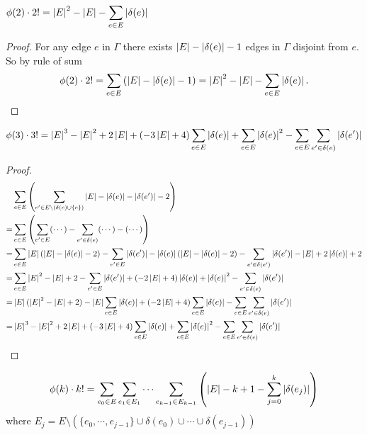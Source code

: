 \begin{lem}
\(\displaystyle \phi(2)\cdot 2! = \left|E\right|^2 - \left|E\right| - \sum_{e \in E} \left|\delta(e)\right|\)
\end{lem}
\begin{proof}
    For any edge \(e\) in \(\Gamma\) there exists \(\left|E\right| - \left|\delta(e)\right| - 1\)
    edges in \(\Gamma\) disjoint from \(e\).
    So by rule of sum
    \[
    \phi(2)\cdot 2! = \sum_{e \in E} \left(\left|E\right| - \left|\delta(e)\right| - 1\right) = \left|E\right|^2 - \left|E\right| - \sum_{e \in E} \left|\delta(e)\right|.
    \]
\end{proof}

\begin{lem}
    \[
\phi(3)\cdot 3! = \left|E\right|^3 - \left|E\right|^2 + 2\left|E\right| + (-3\left|E\right| + 4)\sum_{e \in E}\left|\delta(e)\right| + \sum_{e \in E}\left|\delta(e)\right|^2 - \sum_{e \in E}\sum_{e' \in \delta(e)} \left|\delta(e')\right|
    \]
\end{lem}
\begin{proof}
    \begin{align*}
     & \sum_{e \in E}\left(\sum_{e' \in E \setminus (\delta(e) \cup \{e\})} \left|E\right| - \left|\delta(e)\right| - \left|\delta(e')\right| - 2\right) \\
    =& \sum_{e \in E}\left(\sum_{e' \in E} (\cdots) - \sum_{e' \in \delta(e)} (\cdots) - (\cdots)\right) \\ 
    =& \sum_{e \in E}\left|E\right|(\left|E\right| - \left|\delta(e)\right| - 2) - \sum_{e' \in E} \left|\delta(e')\right| - \left|\delta(e)\right|(\left|E\right| - \left|\delta(e)\right| - 2) - \sum_{e' \in \delta(e')}\left|\delta(e')\right| - \left|E\right| + 2\left|\delta(e)\right| + 2 \\
    =& \sum_{e \in E}\left|E\right|^2 - \left|E\right| + 2 - \sum_{e' \in E} \left|\delta(e')\right| + (-2\left|E\right| + 4) \left|\delta(e)\right| + \left|\delta(e)\right|^2 - \sum_{e' \in \delta(e)} \left|\delta(e')\right| \\
    =& \left|E\right|(\left|E\right|^2 - \left|E\right| + 2) - \left|E\right| \sum_{e \in E}\left|\delta(e)\right| +(-2\left|E\right| + 4) \sum_{e \in E}\left|\delta(e)\right| - \sum_{e \in E}\sum_{e' \in \delta(e)} \left|\delta(e')\right| \\
    =& \left|E\right|^3 - \left|E\right|^2 + 2\left|E\right| + (-3\left|E\right| + 4)\sum_{e \in E}\left|\delta(e)\right| + \sum_{e \in E}\left|\delta(e)\right|^2 - \sum_{e \in E}\sum_{e' \in \delta(e)} \left|\delta(e')\right|
    \end{align*}

\end{proof}

\begin{lem}
\[
\phi(k)\cdot k! = \sum_{e_0 \in E} \sum_{e_1 \in E_1} \cdots \sum_{e_{k-1} \in E_{k-1}} \left(\left|E\right| - k + 1 - \sum_{j=0}^{k} \left|\delta(e_j)\right|\right) 
\]
where \(E_j = E \setminus (\{e_0, \cdots, e_{j-1}\} \cup \delta(e_0) \cup \cdots \cup \delta(e_{j-1}))\)
\end{lem}

